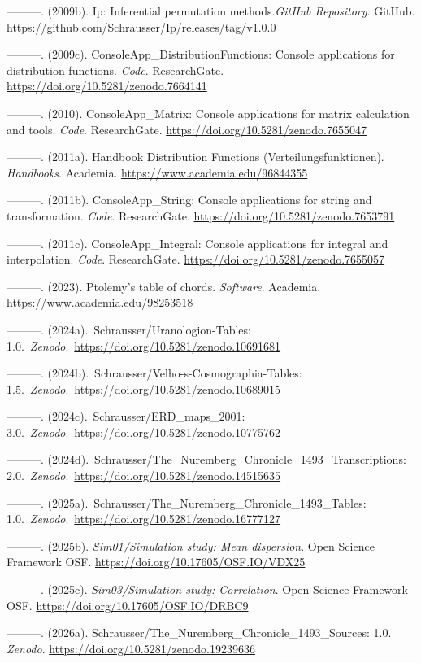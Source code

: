 \documentclass[
]{article}
\begin{document}
---------. (2009b). Ip: Inferential permutation methods.\emph{GitHub
Repository}. GitHub.
\url{https://github.com/Schrausser/Ip/releases/tag/v1.0.0}

---------. (2009c). ConsoleApp\_DistributionFunctions: Console
applications for distribution functions. \emph{Code}. ResearchGate.
\url{https://doi.org/10.5281/zenodo.7664141}

---------. (2010). ConsoleApp\_Matrix: Console applications for matrix
calculation and tools. \emph{Code}. ResearchGate.
\url{https://doi.org/10.5281/zenodo.7655047}

---------. (2011a). Handbook Distribution Functions
(Verteilungsfunktionen). \emph{Handbooks}. Academia.
\url{https://www.academia.edu/96844355}

---------. (2011b). ConsoleApp\_String: Console applications for string
and transformation. \emph{Code}. ResearchGate.
\url{https://doi.org/10.5281/zenodo.7653791}

---------. (2011c). ConsoleApp\_Integral: Console applications for
integral and interpolation. \emph{Code}. ResearchGate.
\url{https://doi.org/10.5281/zenodo.7655057}

---------. (2023). Ptolemy's table of chords. \emph{Software}. Academia.
\url{https://www.academia.edu/98253518}

---------. (2024a).~Schrausser/Uranologion-Tables:
1.0.~\emph{Zenodo}.~\url{https://doi.org/10.5281/zenodo.10691681}

---------. (2024b).~Schrausser/Velho-s-Cosmographia-Tables:
1.5.~\emph{Zenodo}.~\url{https://doi.org/10.5281/zenodo.10689015}

---------. (2024c).~Schrausser/ERD\_maps\_2001:
3.0.~\emph{Zenodo}.~\url{https://doi.org/10.5281/zenodo.10775762}

---------.
(2024d).~Schrausser/The\_Nuremberg\_Chronicle\_1493\_Transcriptions:
2.0.~\emph{Zenodo}.~\url{https://doi.org/10.5281/zenodo.14515635}

---------. (2025a).~Schrausser/The\_Nuremberg\_Chronicle\_1493\_Tables:
1.0.~\emph{Zenodo}.~\url{https://doi.org/10.5281/zenodo.16777127}

---------. (2025b). \emph{Sim01/Simulation study: Mean dispersion}. Open
Science Framework OSF. \url{https://doi.org/10.17605/OSF.IO/VDX25}

---------. (2025c). \emph{Sim03/Simulation study: Correlation}. Open
Science Framework OSF. \url{https://doi.org/10.17605/OSF.IO/DRBC9}

---------. (2026a). Schrausser/The\_Nuremberg\_Chronicle\_1493\_Sources:
1.0. \emph{Zenodo}. \url{https://doi.org/10.5281/zenodo.19239636}
\end{document}
